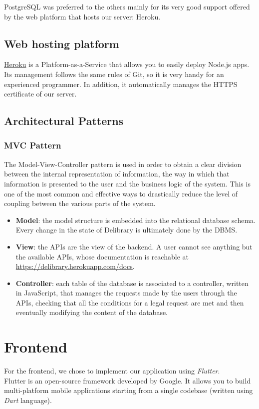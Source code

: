 PostgreSQL was preferred to the others mainly for its very good support offered by the web platform that hosts our server: Heroku.

\subsection{Web hosting platform}
\href{https://www.heroku.com/home}{Heroku} is a Platform-as-a-Service that allows you to easily deploy Node.js apps.
Its management follows the same rules of Git, so it is very handy for an experienced programmer.
In addition, it automatically manages the HTTPS certificate of our server.

\subsection{Architectural Patterns}

\subsubsection{MVC Pattern}
The Model-View-Controller pattern is used in order to obtain a clear division between the internal representation of information, the way in which that information is presented to the user and the business logic of the system.
This is one of the most common and effective ways to drastically reduce the level of coupling between the various parts of the system.

\begin{itemize}
      \item \textbf{Model}:
            the model structure is embedded into the relational database schema.
            Every change in the state of Delibrary is ultimately done by the DBMS.
      \item \textbf{View}:
            the APIs are the view of the backend. A user cannot see anything but the available APIs, whose documentation is reachable at \href{https://delibrary.herokuapp.com/docs/}{https://delibrary.herokuapp.com/docs}.
      \item \textbf{Controller}:
            each table of the database is associated to a controller, written in JavaScript, that manages the requests made by the users through the APIs, checking that all the conditions for a legal request are met and then eventually modifying the content of the database.
\end{itemize}

\clearpage
\section{Frontend}
For the frontend, we chose to implement our application using \textit{Flutter}.\\
Flutter is an open-source framework developed by Google.
It allows you to build multi-platform mobile applications starting from a single codebase (written using \textit{Dart} language).

